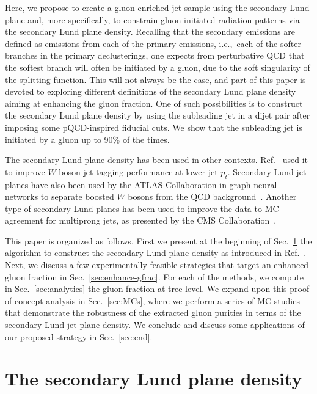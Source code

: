 \documentclass[a4paper,11pt]{article}
\begin{document}
Here, we propose to create a gluon-enriched jet sample using the secondary Lund plane and, more specifically, to constrain gluon-initiated radiation patterns via the secondary Lund plane density. Recalling that the secondary emissions are defined as emissions from each of the primary emissions, i.e.,\ each of the softer branches in the primary declusterings,  one expects from perturbative QCD that the softest branch will often be initiated by a gluon, due to the soft singularity of the splitting function. This will not always be the case, and part of this paper is devoted to exploring different definitions of the secondary Lund plane density aiming at enhancing the gluon fraction. One of such possibilities is to construct the secondary Lund plane density by using the subleading jet in a dijet pair after imposing some pQCD-inspired fiducial cuts. We show that the subleading jet is initiated by a gluon up to 90\% of the times.

The secondary Lund plane density has been used in other contexts. Ref.~\cite{Dreyer:2018nbf} used it to improve $W$ boson jet tagging performance at lower jet $p_t$. Secondary Lund jet planes have also been used by the ATLAS Collaboration in graph neural networks to separate boosted $W$ bosons from the QCD background~\cite{ATL-PHYS-PUB-2023-017}. Another type of secondary Lund planes has been used to improve the data-to-MC agreement for multiprong jets, as presented by the CMS Collaboration~\cite{CMS-DP-2023-046}.

This paper is organized as follows. First we present at the beginning of Sec.~\ref{sec:rhos-def} the algorithm to construct the secondary Lund plane density as introduced in Ref.~\cite{Dreyer:2018nbf}. Next, we discuss a few experimentally feasible strategies that target an enhanced gluon fraction in Sec.~\ref{sec:enhance-gfrac}. For each of the methods, we compute in Sec.~\ref{sec:analytics} the gluon fraction at tree level. We expand upon this proof-of-concept analysis in Sec.~\ref{sec:MCs}, where we perform a series of MC studies that demonstrate the robustness of the extracted gluon purities in terms of the secondary Lund jet plane density. We conclude and discuss some applications of our proposed strategy in Sec.~\ref{sec:end}.    
\section{The secondary Lund plane density}
\label{sec:rhos-def}
\end{document}
